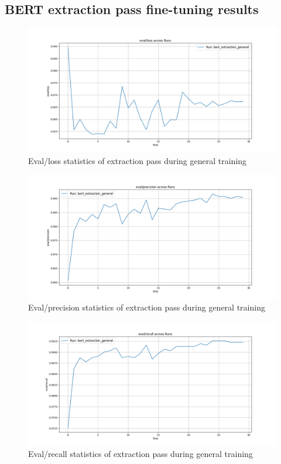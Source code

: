 \documentclass[licencjacka,en]{pracamgr}
\begin{document}
\begin{appendices}
\chapter{BERT extraction pass fine-tuning results} \label{AppD}
\begin{figure}[ht]
    \centering
    \includegraphics[width=0.8\linewidth]{bachelor_images/bert_ft/e_elg.png}
    \caption{Eval/loss statistics of extraction pass during general training}
    \label{fig:e_elg}
\end{figure}
\begin{figure}[ht]
    \centering
    \includegraphics[width=0.8\linewidth]{bachelor_images/bert_ft/e_epg.png}
    \caption{Eval/precision statistics of extraction pass during general training}
    \label{fig:e_epg}
\end{figure}
\begin{figure}[ht]
    \centering
    \includegraphics[width=0.8\linewidth]{bachelor_images/bert_ft/e_erg.png}
    \caption{Eval/recall statistics of extraction pass during general training}
    \label{fig:e_erg}
\end{figure}


\end{appendices}
\end{document}
